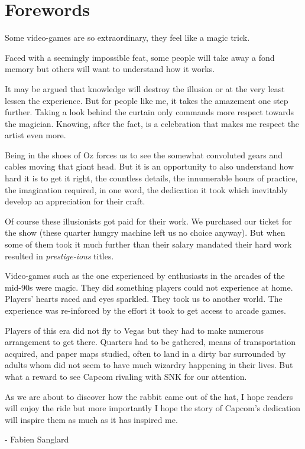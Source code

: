 \chapter*{Forewords}

Some video-games are so extraordinary, they feel like a magic trick.

Faced with a seemingly impossible feat, some people will take away a fond memory but others will want to understand
how it works.

It may be argued that knowledge will destroy the illusion or at the very least lessen the experience. But for people like me, it takes the amazement one step further. Taking a look behind the curtain only commands more respect towards the magician. Knowing, after the fact, is a celebration that makes me respect the artist even more.

Being in the shoes of Oz forces us to see the somewhat convoluted gears and cables moving that giant head. But it is an opportunity to also understand how hard it is to get it right, the countless details, the innumerable hours of practice, the imagination required, in one word, the dedication it took which inevitably develop an appreciation for their craft.


Of course these illusionists got paid for their work. We purchased our ticket for the show (these quarter hungry  machine left us no choice anyway). But when some of them took it much further than their salary mandated their hard work resulted in \emph{prestige-ious} titles.

Video-games such as the one experienced by enthusiasts in the arcades of the mid-90s were magic. They did something players could not experience at home. Players' hearts raced and eyes sparkled. They took us to another world. The experience was re-inforced by the effort it took to get access to arcade games. 

Players of this era did not fly to Vegas but they had to make numerous arrangement to get there. Quarters had to be gathered,  means of transportation acquired, and paper maps studied, often to land in a dirty bar surrounded by adults whom did not seem to have much wizardry happening in their lives. But what a reward to see Capcom rivaling with SNK for our attention. 

As we are about to discover how the rabbit came out of the hat, I hope readers will enjoy the ride but more importantly I hope the story of Capcom's dedication will inspire them as much as it has inspired me.


- Fabien Sanglard